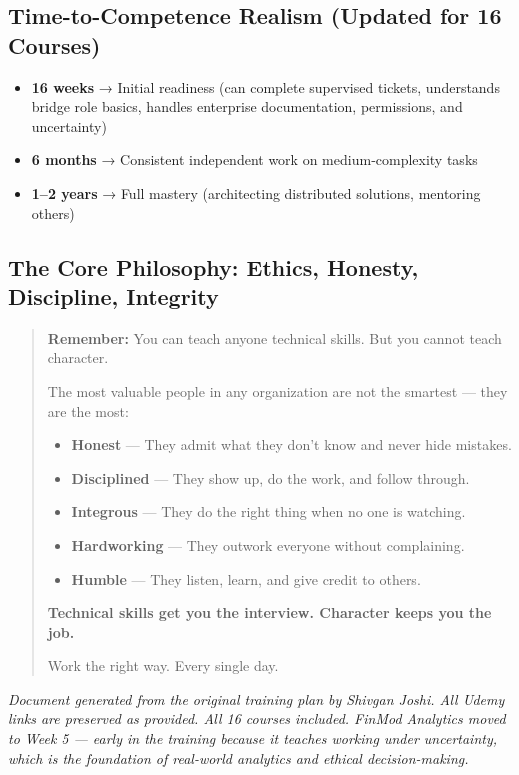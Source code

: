 \documentclass[12pt]{article}
\begin{document}
	\subsection*{Time-to-Competence Realism (Updated for 16 Courses)}
	\begin{itemize}
		\item \textbf{16 weeks} → Initial readiness (can complete supervised tickets, understands bridge role basics, handles enterprise documentation, permissions, and uncertainty)
		\item \textbf{6 months} → Consistent independent work on medium‑complexity tasks
		\item \textbf{1–2 years} → Full mastery (architecting distributed solutions, mentoring others)
	\end{itemize}
	
	\subsection*{The Core Philosophy: Ethics, Honesty, Discipline, Integrity}
	
	\begin{quote}
		\large
		\textbf{Remember:} You can teach anyone technical skills. But you cannot teach character.
		
		\vspace{0.3cm}
		The most valuable people in any organization are not the smartest — they are the most:
		\begin{itemize}
			\item \textbf{Honest} — They admit what they don't know and never hide mistakes.
			\item \textbf{Disciplined} — They show up, do the work, and follow through.
			\item \textbf{Integrous} — They do the right thing when no one is watching.
			\item \textbf{Hardworking} — They outwork everyone without complaining.
			\item \textbf{Humble} — They listen, learn, and give credit to others.
		\end{itemize}
		
		\vspace{0.3cm}
		\noindent \textbf{Technical skills get you the interview. Character keeps you the job.}
		
		\vspace{0.3cm}
		\noindent Work the right way. Every single day.
	\end{quote}
	
	\vspace{1cm}
	\noindent\textit{Document generated from the original training plan by Shivgan Joshi. All Udemy links are preserved as provided. All 16 courses included. FinMod Analytics moved to Week 5 — early in the training because it teaches working under uncertainty, which is the foundation of real-world analytics and ethical decision-making.}
	
\end{document}
